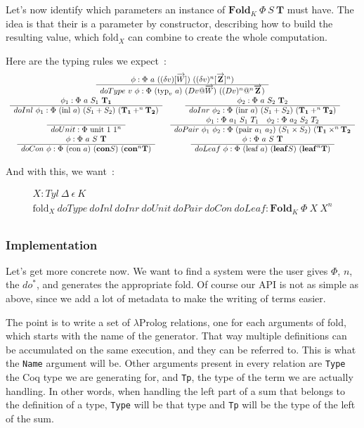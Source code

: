 \documentclass{article}
\newcommand{\vc}[1]{\overrightarrow{#1}}
\newcommand{\con}{\mathbf{con}}
\newcommand{\lf}{\mathbf{leaf}}
\newcommand{\fld}{\mathbf{Fold}}
\newcommand{\irule}[2]{\begin{array}{c} {#1} \\\hline {#2}\\ \end{array}}
\newcommand{\lprog}{$\lambda$Prolog }
\begin{document}
Let's now identify which parameters an instance of $\fld_K\ \Phi\ S\ \mathbf{T}$
must have. The idea is that their is a parameter by constructor, describing
how to build the resulting value, which $\text{fold}_X$ can combine to create
the whole computation.

Here are the typing rules we expect~:
\[\begin{array}{cc}
    \multicolumn{2}{c}{\irule{\phi : \Phi\ a\ ((\delta v)[\vc{W}])\ ((\delta v)^n[\vc{\mathbf{Z}}]^n)}
        {doType\ v\ \phi : \Phi\ (\text{typ}_v\ a)\ (D v @ \vc{W})\ ((D v)^n@^n\vc{\mathbf{Z}})}} \\
    \irule{\phi_1 : \Phi\ a\ S_1\ \mathbf{T_1}}
            {doInl\ \phi_1 : \Phi\ (\text{inl}\ a)\ (S_1 + S_2)\ (\mathbf{T_1} +^n \mathbf{T_2})}
        & \irule{\phi_2 : \Phi\ a\ S_2\ \mathbf{T}_2}
            {doInr\ \phi_2 : \Phi\ (\text{inr}\ a)\ (S_1 + S_2)\ (\mathbf{T_1} +^n \mathbf{T_2})} \\
    \irule{}{doUnit : \Phi\ \text{unit}\ 1\ 1^n}
        & \irule{\phi_1 : \Phi\ a_1\ S_1\ T_1\quad\phi_2 : \Phi\ a_2\ S_2\ T_2}
            {doPair\ \phi_1\ \phi_2 : \Phi\ (\text{pair}\ a_1\ a_2)\
                (S_1\times S_2)\ (\mathbf{T_1}\times^n\mathbf{T_2}} \\
    \irule{\phi : \Phi\ a\ S\ \mathbf{T}}{doCon\ \phi : \Phi\ (\text{con}\ a)\ (\con S)\ (\con^n\mathbf{T})}
        & \irule{\phi : \Phi\ a\ S\ \mathbf{T}}
            {doLeaf\ \phi : \Phi\ (\text{leaf}\ a)\ (\lf S)\ (\lf^n\mathbf{T})} \\
\end{array}\]

And with this, we want~:

\[ \irule{X : Tyl\ \Delta\ \epsilon\ K}
    {\text{fold}_X\ doType\ doInl\ doInr\ doUnit\ doPair\ doCon\ doLeaf : \fld_K\ \Phi\ X\ X^n} \]

\subsubsection{Implementation}

Let's get more concrete now. We want to find a system were the user gives $\Phi$, $n$,
the $do^*$, and generates the appropriate fold. Of course our API is not as
simple as above, since we add a lot of metadata to make the writing of terms
easier.

The point is to write a set of \lprog relations, one for each arguments
of fold, which starts with the name of the generator. That way multiple definitions
can be accumulated on the same execution, and they can be referred to. This is
what the \texttt{Name} argument will be. Other arguments present in every relation
are \texttt{Type} the Coq type we are
generating for, and \texttt{Tp}, the type of the term we are actually
handling. In other words, when handling the left part of a sum that belongs to
the definition of a type, \texttt{Type} will be that type and \texttt{Tp} will
be the type of the left of the sum.
\end{document}
